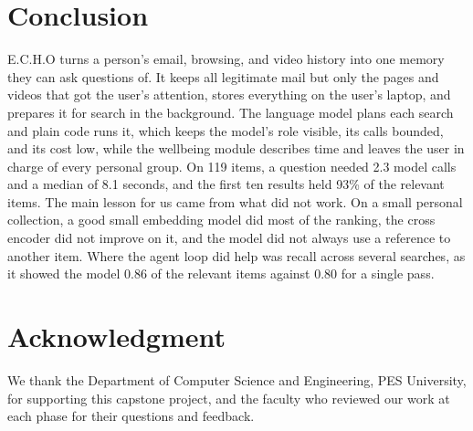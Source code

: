 \documentclass[conference]{IEEEtran}
\begin{document}
\section{Conclusion}\label{sec:conc}
E.C.H.O turns a person's email, browsing, and video history into one memory they can ask questions of. It keeps all legitimate mail but only the pages and videos that got the user's attention, stores everything on the user's laptop, and prepares it for search in the background. The language model plans each search and plain code runs it, which keeps the model's role visible, its calls bounded, and its cost low, while the wellbeing module describes time and leaves the user in charge of every personal group. On 119 items, a question needed 2.3 model calls and a median of 8.1 seconds, and the first ten results held 93\% of the relevant items. The main lesson for us came from what did not work. On a small personal collection, a good small embedding model did most of the ranking, the cross encoder did not improve on it, and the model did not always use a reference to another item. Where the agent loop did help was recall across several searches, as it showed the model 0.86 of the relevant items against 0.80 for a single pass.

\section*{Acknowledgment}
We thank the Department of Computer Science and Engineering, PES University, for supporting this capstone project, and the faculty who reviewed our work at each phase for their questions and feedback.
\end{document}
